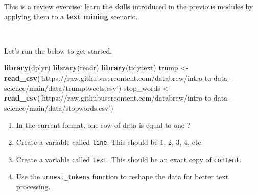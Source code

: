 \documentclass[
]{book}
\newenvironment{Shaded}{\begin{snugshade}}{\end{snugshade}}
\newcommand{\KeywordTok}[1]{\textcolor[rgb]{0.13,0.29,0.53}{\textbf{#1}}}
\newcommand{\NormalTok}[1]{#1}
\newcommand{\OperatorTok}[1]{\textcolor[rgb]{0.81,0.36,0.00}{\textbf{#1}}}
\newcommand{\StringTok}[1]{\textcolor[rgb]{0.31,0.60,0.02}{#1}}
\begin{document}
This is a review exercise: learn the skills introduced in the previous modules by applying them to a \textbf{text mining} scenario.

~

Let's run the below to get started.

\begin{Shaded}
\begin{Highlighting}[]
\KeywordTok{library}\NormalTok{(dplyr)}
\KeywordTok{library}\NormalTok{(readr)}
\KeywordTok{library}\NormalTok{(tidytext)}
\NormalTok{trump <-}\StringTok{ }\KeywordTok{read_csv}\NormalTok{(}\StringTok{'https://raw.githubusercontent.com/databrew/intro-to-data-science/main/data/trumptweets.csv'}\NormalTok{)}
\NormalTok{stop_words <-}\StringTok{ }\KeywordTok{read_csv}\NormalTok{(}\StringTok{'https://raw.githubusercontent.com/databrew/intro-to-data-science/main/data/stopwords.csv'}\NormalTok{)}
\end{Highlighting}
\end{Shaded}

\begin{enumerate}
\def\labelenumi{\arabic{enumi}.}
\item
  In the current format, one row of data is equal to one ?
\item
  Create a variable called \texttt{line}. This should be 1, 2, 3, 4, etc.
\item
  Create a variable called \texttt{text}. This should be an exact copy of \texttt{content}.
\item
  Use the \texttt{unnest\_tokens} function to reshape the data for better text processing.
\end{enumerate}

\begin{Shaded}
\end{Shaded}
\end{document}
